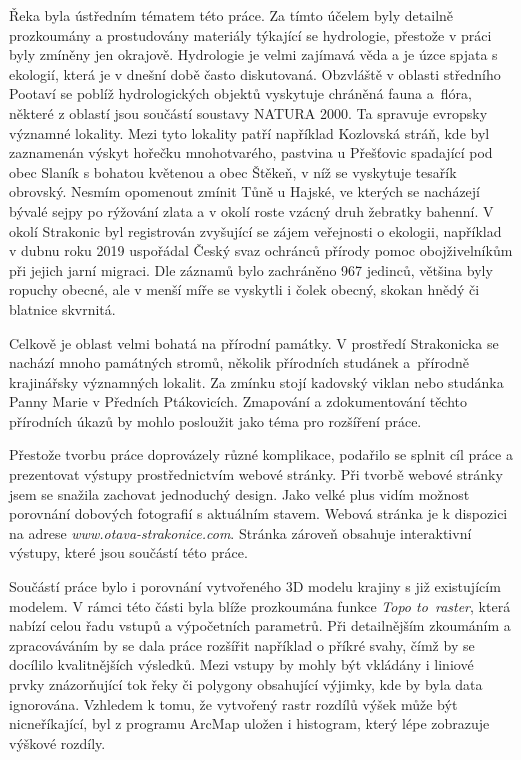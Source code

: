 \documentclass[thesis=M,czech]{FITthesis}[2012/06/26]
\begin{document}
Řeka byla ústředním tématem této práce. Za tímto účelem byly detailně prozkoumány a prostudovány materiály týkající se hydrologie, přestože v práci byly zmíněny jen okrajově. Hydrologie je velmi zajímavá věda a je úzce spjata s ekologií, která je v dnešní době často diskutovaná. Obzvláště v oblasti středního Pootaví se poblíž hydrologických objektů vyskytuje chráněná fauna a~flóra, některé z oblastí jsou součástí soustavy NATURA 2000. Ta spravuje evropsky významné lokality. Mezi tyto lokality patří například Kozlovská stráň, kde byl zaznamenán výskyt hořečku mnohotvarého, pastvina u Přešťovic spadající pod obec Slaník s bohatou květenou a obec Štěkeň, v níž se vyskytuje tesařík obrovský. Nesmím opomenout zmínit Tůně u Hajské, ve kterých se nacházejí bývalé sejpy po rýžování zlata a v okolí roste vzácný druh žebratky bahenní. V okolí Strakonic byl registrován zvyšující se zájem veřejnosti o ekologii, například v dubnu roku 2019 uspořádal Český svaz ochránců přírody pomoc obojživelníkům při jejich jarní migraci. Dle záznamů bylo zachráněno 967 jedinců, většina byly ropuchy obecné, ale v menší míře se vyskytli i čolek obecný, skokan hnědý či blatnice skvrnitá.

Celkově je oblast velmi bohatá na přírodní památky. V prostředí Strakonicka se nachází mnoho památných stromů, několik přírodních studánek a~přírodně krajinářsky významných lokalit. Za zmínku stojí kadovský viklan nebo studánka Panny Marie v Předních Ptákovicích. Zmapování a zdokumentování těchto přírodních úkazů by mohlo posloužit jako téma pro rozšíření práce.



Přestože tvorbu práce doprovázely různé komplikace, podařilo se splnit cíl práce a prezentovat výstupy prostřednictvím webové stránky. Při tvorbě webové stránky jsem se snažila zachovat jednoduchý design. Jako velké plus vidím možnost porovnání dobových fotografií s aktuálním stavem. Webová stránka je k dispozici na adrese \textit{www.otava-strakonice.com}. Stránka zároveň obsahuje interaktivní výstupy, které jsou součástí této práce.


Součástí práce bylo i porovnání vytvořeného 3D modelu krajiny s již existujícím modelem. V rámci této části byla blíže prozkoumána funkce \textit{Topo to~raster}, která nabízí celou řadu vstupů a výpočetních parametrů. Při detailnějším zkoumáním a zpracováváním by se dala práce rozšířit například o příkré svahy, čímž by se docílilo kvalitnějších výsledků. Mezi vstupy by mohly být vkládány i liniové prvky znázorňující tok řeky či polygony obsahující výjimky, kde by byla data ignorována. Vzhledem k tomu, že vytvořený rastr rozdílů výšek může být nicneříkající, byl z programu ArcMap uložen i histogram, který lépe zobrazuje výškové rozdíly.
\end{document}
